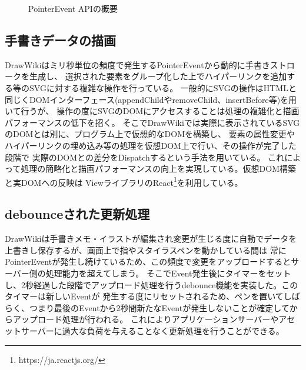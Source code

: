\begin{figure}[htbp]
    \begin{center}
         \end{center}
    \caption{PointerEvent APIの概要} \label{pevent}
\end{figure}

\subsection{手書きデータの描画}
DrawWikiはミリ秒単位の頻度で発生するPointerEventから動的に手書きストロークを生成し、
選択された要素をグループ化した上でハイパーリンクを追加する等のSVGに対する複雑な操作を行っている。
一般的にSVGの操作はHTMLと同じくDOMインターフェース(appendChildやremoveChild、insertBefore等)を用いて行うが、
操作の度にSVGのDOMにアクセスすることは処理の複雑化と描画パフォーマンスの低下を招く。
そこでDrawWikiでは実際に表示されているSVGのDOMとは別に、プログラム上で仮想的なDOMを構築し、
要素の属性変更やハイパーリンクの埋め込み等の処理を仮想DOM上で行い、その操作が完了した段階で
実際のDOMとの差分をDispatchするという手法を用いている。
これによって処理の簡略化と描画パフォーマンスの向上を実現している。仮想DOM構築と実DOMへの反映は
ViewライブラリのReact\footnote{https://ja.reactjs.org/}を利用している。

\subsection{debounceされた更新処理}
DrawWikiは手書きメモ・イラストが編集され変更が生じる度に自動でデータを上書きし保存するが、画面上で指やスタイラスペンを動かしている間は
常にPointerEventが発生し続けているため、この頻度で変更をアップロードするとサーバー側の処理能力を超えてしまう。
そこでEvent発生後にタイマーをセットし、2秒経過した段階でアップロード処理を行うdebounce機能を実装した。このタイマーは新しいEventが
発生する度にリセットされるため、ペンを置いてしばらく、つまり最後のEventから2秒間新たなEventが発生しないことが確定してからアップロード処理が行われる。
これによりアプリケーションサーバーやアセットサーバーに過大な負荷を与えることなく更新処理を行うことができる。


